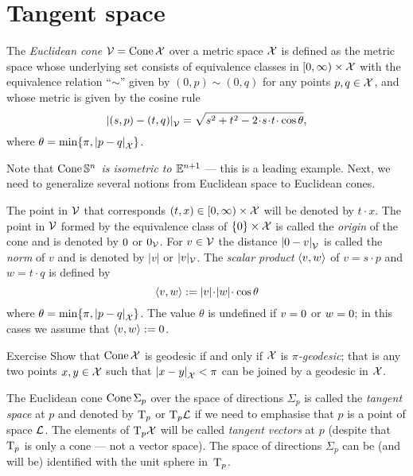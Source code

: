\section{Tangent space}\label{sec: tangent space}

The \emph{Euclidean cone} $\mathcal{V}=\mathop{\rm Cone}\nolimits\mathcal{X}$ 
over a metric space $\mathcal{X}$
is defined as the metric space whose underlying set consists of
equivalence classes in
$[0,\infty)\times \mathcal{X}$ with the equivalence relation ``$\sim$'' given by $(0,p)\sim (0,q)$ for any points $p,q\in\mathcal{X}$,
and whose metric is given by the cosine rule
\[
\dist{(s,p)}{(t,q)}{\spc{V}} 
=
\sqrt{s^2+t^2-2\cdot s\cdot t\cdot \cos\theta},
\]
where $\theta= \min\{\pi, \dist{p}{q}{\spc{X}}\}$.

Note that \textit{$\mathop{\rm Cone}\nolimits\mathbb{S}^n$ is isometric to $\mathbb{E}^{n+1}$} --- this is a leading example.
Next, we need to generalize several notions from Euclidean space to Euclidean cones. 

The point in $\mathcal{V}$ that corresponds $(t,x)\z\in[0,\infty)\times \spc{X}$ will be denoted by $t\cdot x$.
The point in $\mathcal{V}$ formed by the equivalence class of $\{0\}\times\mathcal{X}$ is called the \emph{origin} of the cone and is denoted by $0$ or $0_{\mathcal{V}}$.
For $v\in\mathcal{V}$ the distance $\dist{\0}{v}{\spc{V}}$ is called the \emph{norm} of $v$ and is denoted by $|v|$ or $|v|_{\mathcal{V}}$.
The \emph{scalar product} $\langle v,w\rangle$
of $v=s\cdot p$ and $w=t\cdot q$
is defined by 
\[\<v,w\>
\df |v|\cdot|w|\cdot\cos\theta
\]
where $\theta= \min\{\pi, \dist{p}{q}{\spc{X}}\}$.
The value $\theta$ is undefined if $v=0$ or $w=0$;
in this cases we assume that $\langle v,w\rangle\mathrel{:=}0$.

\begin{thm}{Exercise}\label{ex:geodesic-cone}
Show that $\mathop{\rm Cone}\nolimits\mathcal{X}$ is geodesic if and only if $\mathcal{X}$ is \emph{$\pi$-geodesic};
that is any two points $x,y\in \mathcal{X}$ such that $\dist{x}{y}{\spc{X}}<\pi$ can be joined by a geodesic in $\mathcal{X}$.
\end{thm}

The Euclidean cone $\mathop{\rm Cone}\nolimits\Sigma_p$ over the space of directions $\Sigma_p$ is called the \emph{tangent space} at $p$ and denoted by $\mathrm{T}_p$ or $\mathrm{T}_p\mathcal{L}$ if we need to emphasise that $p$ is a point of space $\mathcal{L}$.
The elements of $\mathrm{T}_p\mathcal{X}$ will be called \emph{tangent vectors} at $p$
(despite that $\mathrm{T}_p$ is only a cone --- not a vector space).
The space of directions $\Sigma_p$ can be (and will be) identified with the unit sphere in~$\mathrm{T}_p$.

